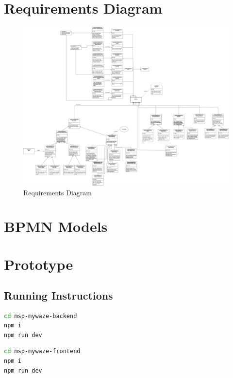 \documentclass{article}
\begin{document}
\clearpage
\section*{Requirements Diagram}
\begin{figure}[h]
    \centering
    \includegraphics[width=\textwidth]{images/SysML_Req.png}
    \caption{Requirements Diagram}
    \label{fig:requirements_diagram}
\end{figure}

\clearpage

\section*{BPMN Models}


\clearpage

\section*{Prototype}
\subsection*{Running Instructions}

\begin{lstlisting}[language=bash]
cd msp-mywaze-backend
npm i
npm run dev
\end{lstlisting}

\begin{lstlisting}[language=bash]
cd msp-mywaze-frontend
npm i
npm run dev
\end{lstlisting}
\end{document}
